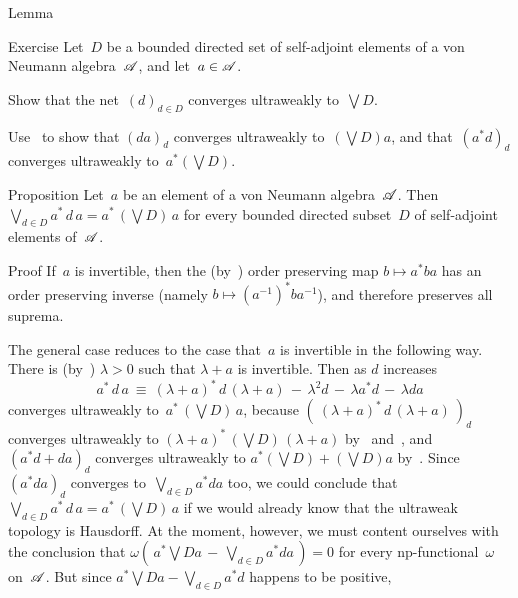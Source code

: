 \documentclass[a]{subfiles}
\begin{document}
\begin{parsec}
\begin{point}{Lemma}
\end{point}
\begin{point}{Exercise}%
Let~$D$ be a bounded directed set of self-adjoint
elements of a von Neumann algebra~$\mathscr{A}$,
and let~$a\in \mathscr{A}$.
\begin{point}%
Show that the net~$(d)_{d\in D}$ converges ultraweakly to~$\bigvee D$.
\end{point}
\begin{point}%
Use~
to show that $(da)_d$ converges ultraweakly to~$(\bigvee D)a$,
and that~$(a^*d)_d$ converges ultraweakly to~$a^* (\bigvee D)$.
\end{point}
\end{point}
%
%
\begin{point}[ad-normal]{Proposition}%
Let~$a$ be an element of a von Neumann algebra~$\mathscr{A}$.
Then~$\bigvee_{d\in D} a^*\,d\,a = a^*\,(\bigvee D)\, a$
for every bounded directed subset~$D$ of self-adjoint
elements of~$\mathscr{A}$.
\begin{point}[ad-normal-1]{Proof}%
If~$a$ is invertible,
then the (by~) order preserving map $b\mapsto a^*ba$
has an order preserving inverse (namely $b\mapsto (a^{-1})^* b a^{-1}$),
and therefore preserves all suprema.
\begin{point}%
The general case reduces to the case that~$a$ 
is invertible
in the following way.
There is (by~)
 $\lambda>0$ such that $\lambda+a$ is invertible.
Then as $d$ increases 
\begin{equation*}
a^*\,d\,a \ \equiv\  (\lambda+a)^*\,d\,(\lambda+a) \,-\,
 \lambda^2d \,-\, \lambda a^*d \,-\, \lambda da
\end{equation*}
converges ultraweakly
to~$a^* \,(\bigvee D)\,a$,
because $(\ (\lambda+a)^*\,d\,(\lambda+a)\ )_d$
converges ultraweakly to $(\lambda+a)^*\,(\bigvee D)\,(\lambda+a)$
by~ and~,
and $(a^*d+da)_d$ converges ultraweakly to $a^*(\bigvee D)+(\bigvee D)a$
by~.
Since~$(a^*da)_d$ converges to~$\bigvee_{d\in D} a^*d a$ too,
we could conclude that
$\bigvee_{d\in D} a^* \,d\, a = a^*\,(\bigvee D)\,a$
if we would already know that the ultraweak topology is Hausdorff.
At the moment, however,
we must content ourselves with
the conclusion that
$\omega(\,a^*\bigvee D a\,-\, \bigvee_{d\in D} a^* d a\,)=0$
for every np-functional~$\omega$ on~$\mathscr{A}$.
But since
$a^*\bigvee D a - 
\bigvee_{d\in D} a^* d$
happens to be positive,

\end{point}
\end{point}
\end{point}
\end{parsec}
\end{document}
